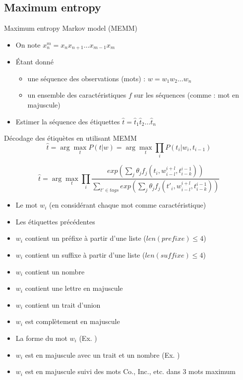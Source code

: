 \documentclass{KodeBook}
\begin{document}
\subsection{Maximum entropy}

Maximum entropy Markov model (MEMM)
\begin{itemize}
	\item On note $x_{n}^{m} = x_n x_{n+1} \ldots x_{m-1} x_m$
	\item Étant donné 
	\begin{itemize}
		\item une séquence des observations (mots) : $w = w_1 w_2 \ldots w_n$
		\item un ensemble des caractéristiques $f$ sur les séquences (comme : mot en majuscule)
	\end{itemize}
	\item Estimer la séquence des étiquettes $\hat{t} = \hat{t}_1 \hat{t}_2 \ldots \hat{t}_n$
\end{itemize}

\begin{block}{Décodage des étiquètes en utilisant MEMM}
	\[
	\hat{t} = \arg\max\limits_t P(t | w) = \arg\max\limits_t \prod\limits_{i}  P(t_i | w_i, t_{i-1})
	\]
	
	\[
	\hat{t} = \arg\max\limits_t \prod\limits_{i}  
	\frac{exp\left(\sum_j \theta_j f_j(t_i, w_{i-l}^{i+l}, t_{i-k}^{i-1})\right)}%
	{\sum_{t' \in tags} exp\left(\sum_j \theta_j f_j(t'_i, w_{i-l}^{i+l}, t_{i-k}^{i-1})\right)}
	\]
	
\end{block}

\begin{itemize}
	\item Le mot $w_i$ (en considérant chaque mot comme caractéristique)
	\item Les étiquettes précédentes 
	\item $w_i$ contient un préfixe à partir d'une liste ($len(prefixe) \le 4$) 
	\item $w_i$ contient un suffixe à partir d'une liste ($len(suffixe) \le 4$) 
	\item $w_i$ contient un nombre 
	\item $w_i$ contient une lettre en majuscule
	\item $w_i$ contient un trait d'union 
	\item $w_i$ est complètement en majuscule
	\item La forme du mot $w_i$ (Ex. ) 
	\item $w_i$ est en majuscule avec un trait et un nombre (Ex. ) 
	\item $w_i$ est en majuscule suivi des mots Co., Inc., etc. dans 3 mots maximum
\end{itemize}
\end{document}
